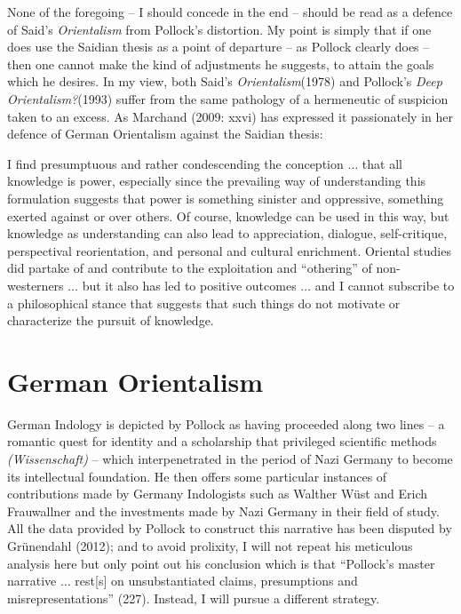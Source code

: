 None of the foregoing – I should concede in the end – should be read as a defence of Said’s {\sl Orientalism} from Pollock’s distortion. My point is simply that if one does use the Saidian thesis as a point of departure – as Pollock clearly does – then one cannot make the kind of adjustments he suggests, to attain the goals which he desires. In my view, both Said’s {\sl Orientalism}(1978) and Pollock’s {\sl Deep Orientalism?}(1993) suffer from the same pathology of a hermeneutic of suspicion taken to an excess. As Marchand (2009: xxvi) has expressed it passionately in her defence of German Orientalism against the Saidian thesis:
\newpage

\begin{myquote}
I find presumptuous and rather condescending the conception $\ldots$ that all knowledge is power, especially since the prevailing way of understanding this formulation suggests that power is something sinister and oppressive, something exerted against or over others. Of course, knowledge can be used in this way, but knowledge as understanding can also lead to appreciation, dialogue, self-critique, perspectival reorientation, and personal and cultural enrichment. Oriental studies did partake of and contribute to the exploitation and “othering” of non-westerners $\ldots$ but it also has led to positive outcomes $\ldots$ and I cannot subscribe to a philosophical stance that suggests that such things do not motivate or characterize the pursuit of knowledge.
\end{myquote}
\vskip -40pt


\section*{German Orientalism}
\vskip -3pt

German Indology is depicted by Pollock as having  proceeded along two lines – a romantic quest for identity and a scholarship that privileged scientific methods {\sl (Wissenschaft)} – which interpenetrated in the period of Nazi  Germany to become its intellectual foundation. He then offers some particular instances of contributions made by Germany Indologists such as Walther Wüst and Erich  Frauwallner and the investments made by Nazi Germany in their field of study. All the data provided by Pollock to construct this narrative has been disputed by Grünendahl (2012); and to avoid prolixity, I will not repeat his meticulous analysis here but only point out his conclusion which is that “Pollock’s master narrative $\ldots$ rest[s] on unsubstantiated claims, presumptions and misrepresentations”  (227). Instead, I will pursue a different strategy.

